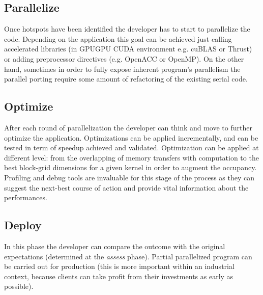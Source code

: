 \subsection{Parallelize}
Once hotspots have been identified the developer has to start to parallelize
the code. Depending on the application this goal can be achieved just calling
accelerated libraries (in GPUGPU CUDA environment e.g. cuBLAS or Thrust) or
adding preprocessor directives (e.g. OpenACC or OpenMP). On the other hand,
sometimes in order to fully expose inherent program's parallelism the parallel
porting require some amount of refactoring of the existing serial code.

\subsection{Optimize}
After each round of parallelization the developer can think and move to further
optimize the application. Optimizations can be applied incrementally, and can be
tested in term of speedup achieved and validated.
Optimization can be applied at different level: from the overlapping of memory
transfers with computation to the best block-grid dimensions for a
given kernel in order to augment the occupancy. Profiling and debug tools are
invaluable for this stage of the process as they can suggest the next-best
course of action and provide vital information about the performances.

\subsection{Deploy}
In this phase the developer can compare the outcome with the original
expectations (determined at the \textit{assess} phase). Partial parallelized
program can be carried out for production (this is more important within an
industrial context, because clients can take profit from their investments as
early as possible).

